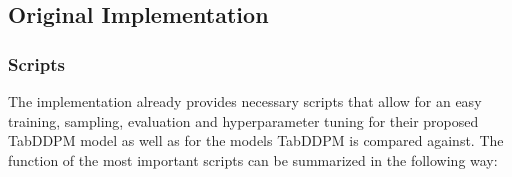 \subsection{Original Implementation}
\label{ch:conceptualDesign-existingCodeBase-originalImplementation}

\subsubsection[]{Scripts}
\label{ch:scripts}

The implementation \cite{kotelnikov2022TabDDPMModellingTabular} already provides necessary scripts that allow for an
easy training, sampling, evaluation and hyperparameter tuning for their proposed TabDDPM model as well as for the models TabDDPM is compared against.
The function of the most important scripts can be summarized in the following way:

